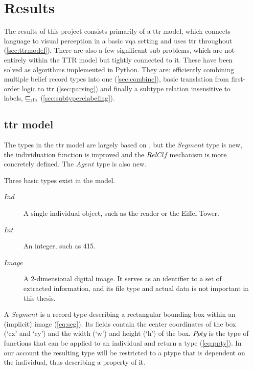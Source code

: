 \section{Results}
\label{sec:results}

The results of this project consists primarily of a \gls{ttr} model, which connects language to visual perception in a basic \gls{vqa} setting and uses \gls{ttr} throughout (\autoref{sec:ttrmodel}).
There are also a few significant sub-problems, which are not entirely within the TTR model but tightly connected to it.
These have been solved as algorithms implemented in Python.
They are: efficiently combining multiple belief record types into one (\autoref{sec:combine}), basic translation from first-order logic to \gls{ttr} (\autoref{sec:parsing}) and finally a subtype relation insensitive to labels, $\mathrel{\sqsubseteq_\text{rlb}}$ (\autoref{sec:subtyperelabeling}).



\subsection{\Acrshort{ttr} model}
\label{sec:ttrmodel}

The types in the \gls{ttr} model are largely based on \cite{lspc}, but the $Segment$ type is new, the individuation function is improved and the $RelClf$ mechanism is more concretely defined.
The $Agent$ type is also new.

Three basic types exist in the model.

\begin{description}
\item [$Ind$] A single individual object, such as the reader or the Eiffel Tower.
\item [$Int$] An integer, such as 415.
\item [$Image$] A 2-dimensional digital image. It serves as an identifier to a set of extracted information, and its file type and actual data is not important in this thesis.
\end{description}

A $Segment$ is a record type describing a rectangular bounding box within an (implicit) image (\autoref{eq:seg}).
Its fields contain the center coordinates of the box (`cx' and `cy') and the width (`w') and height (`h') of the box.
$Ppty$ is the type of functions that can be applied to an individual and return a type (\autoref{eq:ppty}).
In our account the resulting type will be restricted to a ptype that is dependent on the individual, thus describing a property of it.

